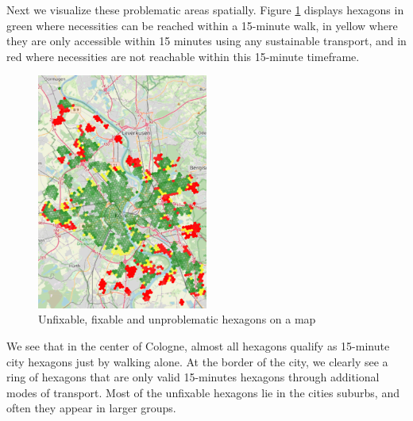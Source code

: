 Next we visualize these problematic areas spatially.
Figure \ref{fig:problematic_hexagons} displays hexagons in green where necessities can be reached within a 15-minute walk, in yellow where they are only accessible within 15 minutes using any sustainable transport, and in red where necessities are not reachable within this 15-minute timeframe.
\begin{figure}
  \begin{center}
    \includegraphics[width=0.50\textwidth]{Figures/results/problematic_hexagons/problematic_hexagons}
  \end{center}
  \caption{Unfixable, fixable and unproblematic hexagons on a map}
  \label{fig:problematic_hexagons}
\end{figure}
We see that in the center of Cologne, almost all hexagons qualify as 15-minute city hexagons just by walking alone.
At the border of the city, we clearly see a ring of hexagons that are only valid 15-minutes hexagons through additional modes of transport.
Most of the unfixable hexagons lie in the cities suburbs, and often they appear in larger groups.

